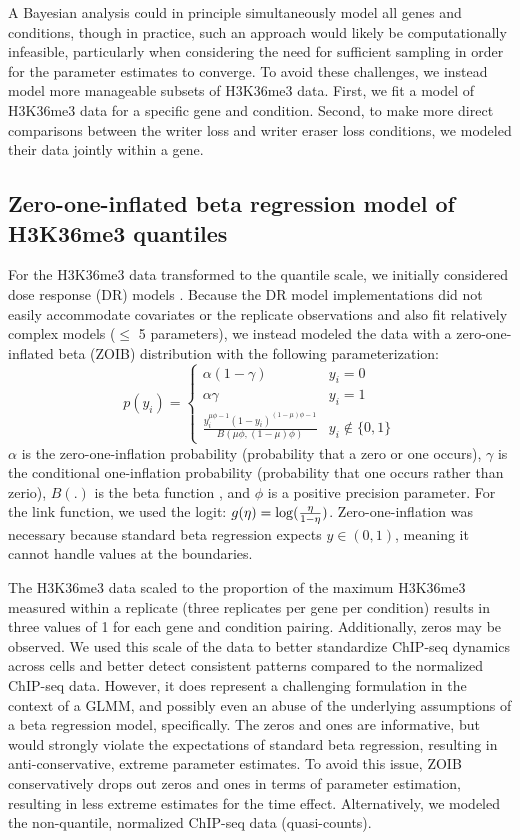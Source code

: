 \documentclass[11pt]{biorxiv}
\begin{document}
A Bayesian analysis could in principle simultaneously model all genes and conditions, though in practice, such an approach would likely be computationally infeasible, particularly when considering the need for sufficient sampling in order for the parameter estimates to converge. To avoid these challenges, we instead model more manageable subsets of H3K36me3 data. First, we fit a model of H3K36me3 data for a specific gene and condition. Second, to make more direct comparisons between the writer loss and writer eraser loss conditions, we modeled their data jointly within a gene.
	
\subsection{Zero-one-inflated beta regression model of H3K36me3 quantiles}
For the H3K36me3 data transformed to the quantile scale, we initially considered dose response (DR) models \citep{Slob2002, Wilson2014}. Because the DR model implementations did not easily accommodate covariates or the replicate observations and also fit relatively complex models ($\le$ 5 parameters), we instead modeled the data with a zero-one-inflated beta (ZOIB) distribution with the following parameterization:
\begin{equation}
	p(y_{i}) = \begin{cases} 
      			\alpha(1 - \gamma) & y_{i} = 0 \\
      			\alpha \gamma & y_{i} = 1 \\
     			 \frac{y_{i}^{\mu\phi - 1}(1 - y_{i})^{(1 - \mu)\phi - 1}}{B(\mu \phi, (1 - \mu)\phi)} & y_{i} \not\in \{0, 1\}
   		\end{cases}
\end{equation}
$\alpha$ is the zero-one-inflation probability (probability that a zero or one occurs), $\gamma$ is the conditional one-inflation probability (probability that one occurs rather than zerio), $B(.)$ is the beta function \citep{Casella2002}, and $\phi$ is a positive precision parameter. For the link function, we used the logit: $g(\eta)= \log\large(\frac{\eta}{1 - \eta}\large)$. Zero-one-inflation was necessary because standard beta regression expects $y \in (0, 1)$, meaning it cannot handle values at the boundaries.

The H3K36me3 data scaled to the proportion of the maximum H3K36me3 measured within a replicate (three replicates per gene per condition) results in three values of 1 for each gene and condition pairing. Additionally, zeros may be observed. We used this scale of the data to better standardize ChIP-seq dynamics across cells and better detect consistent patterns compared to the normalized ChIP-seq data. However, it does represent a challenging formulation in the context of a GLMM, and possibly even an abuse of the underlying assumptions of a beta regression model, specifically. The zeros and ones are informative, but would strongly violate the expectations of standard beta regression, resulting in anti-conservative, extreme parameter estimates. To avoid this issue, ZOIB conservatively drops out zeros and ones in terms of parameter estimation, resulting in less extreme estimates for the time effect. Alternatively, we modeled the non-quantile, normalized ChIP-seq data (quasi-counts).
\end{document}
